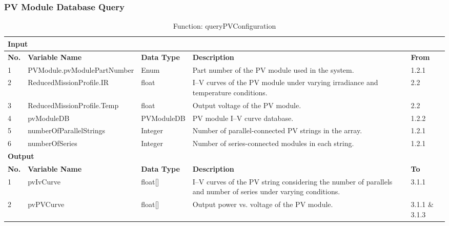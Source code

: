 \documentclass{article}
\begin{document}
\subsubsection{PV Module Database Query}
\begin{table}[h]
\centering
\caption{Function: queryPVConfiguration}
\begin{tabular}{|l|p{4cm}|p{2cm}|p{5cm}|p{2cm}|}
\hline
\multicolumn{5}{|l|}{\textbf{Input}} \\ \hline
\textbf{No.} & \textbf{Variable Name} & \textbf{Data Type} & \textbf{Description} & \textbf{From} \\ \hline
1 & PVModule.pvModulePartNumber & Enum & Part number of the PV module used in the system. & 1.2.1 \\ \hline
2 & ReducedMissionProfile.IR & float & I–V curves of the PV module under varying irradiance and temperature conditions. & 2.2 \\ \hline
3 & ReducedMissionProfile.Temp & float & Output voltage of the PV module. & 2.2 \\ \hline
4 & pvModuleDB & PVModuleDB & PV module I–V curve database. & 1.2.2 \\ \hline
5 & numberOfParallelStrings & Integer & Number of parallel-connected PV strings in the array. & 1.2.1 \\ \hline
6 & numberOfSeries & Integer & Number of series-connected modules in each string. & 1.2.1 \\ \hline
\multicolumn{5}{|l|}{\textbf{Output}} \\ \hline
\textbf{No.} & \textbf{Variable Name} & \textbf{Data Type} & \textbf{Description} & \textbf{To} \\ \hline
1 & pvIvCurve & float[] & I–V curves of the PV string considering the number of parallels and number of series under varying conditions. & 3.1.1 \\ \hline
2 & pvPVCurve & float[] & Output power vs. voltage of the PV module. & 3.1.1 \& 3.1.3 \\ \hline
\end{tabular}
\end{table}
\end{document}
